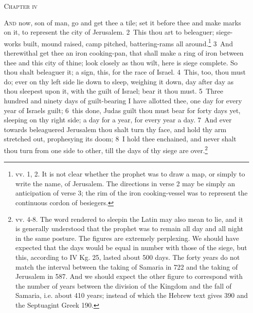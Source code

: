 \documentclass[10pt]{book} %
\begin{document}
\begin{large}\begin{center}\textsc{Chapter iv}\end{center}\end{large}
\lettrine[lines=2]{A}{nd} now, son of man, go and get thee a tile; set it before thee and make marks on it, to represent the city of Jerusalem. \textcolor{benred8}{2}~This thou art to beleaguer; siege-works built, mound raised, camp pitched, battering-rams all around.\footnote[1]{vv. 1, 2. It is not clear whether the prophet was to draw a map, or simply to write the name, of Jerusalem. The directions in verse 2 may be simply an anticipation of verse 3; the rim of the iron cooking-vessel was to represent the continuous cordon of besiegers.} \textcolor{benred8}{3}~And therewithal get thee an iron cooking-pan, that shall make a ring of iron between thee and this city of thine; look closely as thou wilt, here is siege complete. So thou shalt beleaguer it; a sign, this, for the race of Israel.
\textcolor{benred8}{4}~This, too, thou must do; ever on thy left side lie down to sleep, weighing it down, day after day as thou sleepest upon it, with the guilt of Israel; bear it thou must. \textcolor{benred8}{5}~Three hundred and ninety days of guilt-bearing I have allotted thee, one day for every year of Israel\textquotesingle s guilt; \textcolor{benred8}{6}~this done, Juda\textquotesingle s guilt thou must bear for forty days yet, sleeping on thy right side; a day for a year, for every year a day. \textcolor{benred8}{7}~And ever towards beleaguered Jerusalem thou shalt turn thy face, and hold thy arm stretched out, prophesying its doom; \textcolor{benred8}{8}~I hold thee enchained, and never shalt thou turn from one side to other, till the days of thy siege are over.\footnote[2]{vv. 4-8. The word rendered \textasciigrave to sleep\textquotesingle  in the Latin may also mean \textasciigrave to lie\textquotesingle , and it is generally understood that the prophet was to remain all day and all night in the same posture. The figures are extremely perplexing. We should have expected that the days would be equal in number with those of the siege, but this, according to IV Kg. 25, lasted about 500 days. The forty years do not match the interval between the taking of Samaria in 722 and the taking of Jerusalem in 587. And we should expect the other figure to correspond with the number of years between the division of the Kingdom and the fall of Samaria, i.e. about 410 years; instead of which the Hebrew text gives 390 and the Septuagint Greek 190.}
\end{document}
